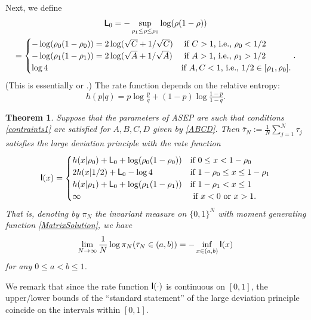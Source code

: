 \documentclass{amsart}
\newtheorem{theorem}{Theorem}[section]
\theoremstyle{definition}
\theoremstyle{remark}
\theoremstyle{remark}
\theoremstyle{definition}
\numberwithin{equation}{section}
\begin{document}
 Next, we define
\begin{multline}
  \label{L0}
  {\mbox{\fontfamily{phv}\selectfont L}}_0=- \sup_{\rho_1\leq \rho\leq \rho_0} \log(\rho(1-\rho))  \\=\begin{cases}
    - \log(\rho_0(1-\rho_0))= 2\log (\sqrt{C}+1/\sqrt{C}) & \mbox{ if $C>1$, i.e., $\rho_0<1/2$}\\
     - \log(\rho_1(1-\rho_1))= 2\log (\sqrt{A}+1/\sqrt{A}) & \mbox{ if $A>1$, i.e., $\rho_1>1/2$}\\
     \log 4 &\mbox{if $A,C<1$, i.e., $1/2\in[\rho_1,\rho_0]$}.
  \end{cases}.
\end{multline}
(This  is essentially \cite[expression (1.5)]{derrida2003exact} or \cite[expression (1.7)]{enaud2004large}.) The rate function
depends on the relative entropy:
\begin{equation}
  \label{h}
  h(p|q)=p \log \tfrac{p}{q}+(1-p)\log\tfrac{1-p}{1-q}.
\end{equation}
\begin{theorem} \label{T-LDP} Suppose that the parameters of ASEP are such that conditions \eqref{contraints1} are satisfied for $A,B,C,D$ given by \eqref{ABCD}.
  Then $\bar\tau_N:=\frac1N\sum_{j=1}^N\tau_j$ satisfies the large deviation principle with the rate function
  \begin{equation}
    \label{I}
    {\mbox{\fontfamily{phv}\selectfont I}}(x)=\begin{cases}
     h(x|\rho_0) +{\mbox{\fontfamily{phv}\selectfont L}}_0+\log(\rho_0(1-\rho_0))& \mbox{if $0\leq x<1-\rho_0$}\\
     2 h(x|1/2)+{\mbox{\fontfamily{phv}\selectfont L}}_0-\log 4 &\mbox{if $1-\rho_0\leq x\leq 1-\rho_1$} \\
       h(x|\rho_1) +{\mbox{\fontfamily{phv}\selectfont L}}_0+\log(\rho_1(1-\rho_1))& \mbox{if $1-\rho_1<x\leq 1$}\\
      \infty &\mbox{ if $x< 0$ or $x> 1$}.
    \end{cases}
  \end{equation}
  That is, denoting by $\pi_N$ the invariant measure on $\{0,1\}^N$ with moment generating function \eqref{MatrixSolution}, we have
  \begin{equation}
    \label{LDP1}
    \lim_{N\to\infty} \frac1N\log \pi_N(\bar\tau_N\in(a,b))=-\inf_{x\in(a,b)}{\mbox{\fontfamily{phv}\selectfont I}}(x)
  \end{equation}
  for any $0\leq a<b\leq 1$.
\end{theorem}
We  remark that since the rate function ${\mbox{\fontfamily{phv}\selectfont I}}(\cdot)$ is continuous on $[0,1]$, the upper/lower bounds of the ``standard statement'' of the large deviation principle coincide on the intervals within $[0,1]$.
\end{document}
